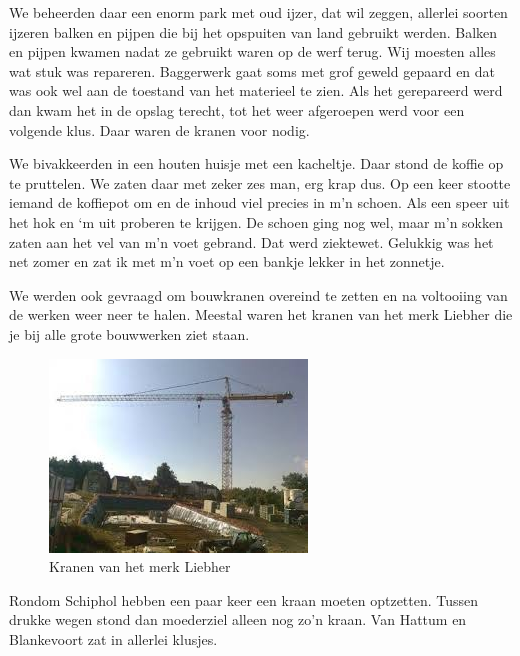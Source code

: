 \documentclass[10pt,twoside, openright]{memoir}
\begin{document}
We beheerden daar een enorm park met oud ijzer, dat wil zeggen, allerlei soorten ijzeren balken en pijpen die bij het opspuiten van land gebruikt werden. Balken en pijpen kwamen nadat ze gebruikt waren op de werf terug. Wij moesten alles wat stuk was repareren. Baggerwerk gaat soms met grof geweld gepaard en dat was ook wel aan de toestand van het materieel te zien. Als het gerepareerd werd dan kwam het in de opslag terecht, tot het weer afgeroepen werd voor een volgende klus. Daar waren de kranen voor nodig. 

We bivakkeerden in een houten huisje met een kacheltje. Daar stond de koffie op te pruttelen. We zaten daar met zeker zes man, erg krap dus. Op een keer stootte iemand de koffiepot om en de inhoud viel precies in m'n schoen. Als een speer uit het hok en `m uit proberen te krijgen. De schoen ging nog wel, maar m'n sokken zaten aan het vel van m'n voet gebrand. Dat werd ziektewet. Gelukkig was het net zomer en zat ik met m'n voet op een bankje lekker in het zonnetje.

We werden ook gevraagd om bouwkranen overeind te zetten en na voltooiing van de werken weer neer te halen. Meestal waren het kranen van het merk Liebher die je bij alle grote bouwwerken ziet staan. 

\begin{figure}
\includegraphics[width=\textwidth]{img/ch38/liebher}
\caption*{\footnotesize Kranen van het merk Liebher}
\end{figure}

Rondom Schiphol hebben een paar keer een kraan moeten optzetten. Tussen drukke wegen stond dan moederziel alleen nog zo’n kraan. Van Hattum en Blankevoort zat in allerlei klusjes.
\end{document}
